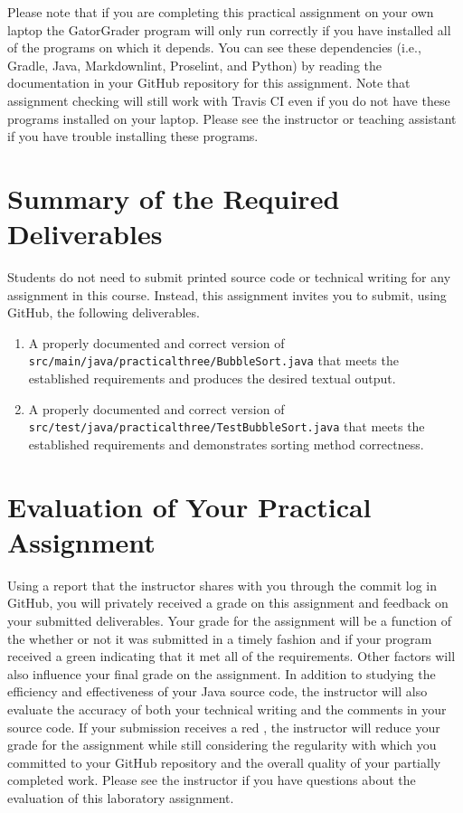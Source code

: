 \documentclass[11pt]{article}
\newcommand{\mainprogramsource}{\lstinline{src/main/java/practicalthree/BubbleSort.java}}
\newcommand{\testprogramsource}{\lstinline{src/test/java/practicalthree/TestBubbleSort.java}}
\newcommand{\checkmark}{\ding{51}}
\newcommand{\naughtmark}{\ding{55}}
\begin{document}
Please note that if you are completing this practical assignment on your own
laptop the GatorGrader program will only run correctly if you have installed all
of the programs on which it depends. You can see these dependencies (i.e.,
Gradle, Java, Markdownlint, Proselint, and Python) by reading the documentation
in your GitHub repository for this assignment. Note that assignment checking
will still work with Travis CI even if you do not have these programs installed
on your laptop. Please see the instructor or teaching assistant if you have
trouble installing these programs.

\section*{Summary of the Required Deliverables}

\noindent Students do not need to submit printed source code or technical
writing for any assignment in this course. Instead, this assignment invites you
to submit, using GitHub, the following deliverables.

\begin{enumerate}

  \setlength{\itemsep}{0in}

\item A properly documented and correct version of \mainprogramsource{} that
  meets the established requirements and produces the desired textual output.

\item A properly documented and correct version of \testprogramsource{} that
  meets the established requirements and demonstrates sorting method
  correctness.

\end{enumerate}

\section*{Evaluation of Your Practical Assignment}

Using a report that the instructor shares with you through the commit log in
GitHub, you will privately received a grade on this assignment and feedback on
your submitted deliverables. Your grade for the assignment will be a function of
the whether or not it was submitted in a timely fashion and if your program
received a green \checkmark{} indicating that it met all of the requirements.
Other factors will also influence your final grade on the assignment. In
addition to studying the efficiency and effectiveness of your Java source code,
the instructor will also evaluate the accuracy of both your technical writing
and the comments in your source code. If your submission receives a red
\naughtmark{}, the instructor will reduce your grade for the assignment while
still considering the regularity with which you committed to your GitHub
repository and the overall quality of your partially completed work. Please see
the instructor if you have questions about the evaluation of this laboratory
assignment.
\end{document}
